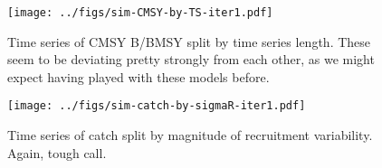 \documentclass[12pt]{article}
\begin{document}
\begin{figure}[htbp]
\begin{center}
  \texttt{[image: ../figs/sim-CMSY-by-TS-iter1.pdf]}
\caption{Time series of CMSY B/BMSY split by time series length. These seem to
be deviating pretty strongly from each other, as we might expect having played
with these models before.}
\end{center}
\end{figure}

\begin{figure}[htbp]
\begin{center}
  \texttt{[image: ../figs/sim-catch-by-sigmaR-iter1.pdf]}
\caption{Time series of catch split by magnitude of recruitment variability.
  Again, tough call.}
\end{center}
\end{figure}
\end{document}
